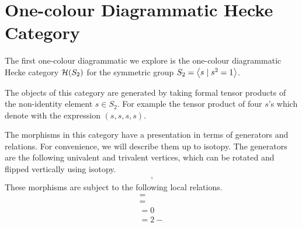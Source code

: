 \section{One-colour Diagrammatic Hecke Category}

The first one-colour diagrammatic we explore is the one-colour diagrammatic Hecke category $\mathcal{H}(S_2)$ for the symmetric group $S_2 = {\left\langle s \mathrel{|} s^2 = 1 \right\rangle}$. %

The objects of this category are generated by taking formal tensor products of the non-identity element $s \in S_2$. For example the tensor product of four $s$'s which denote with the expression $(s,s,s,s)$.

The morphisms in this category have a presentation in terms of generators and relations. For convenience, we will describe them up to isotopy. %
The generators are the following univalent and trivalent vertices, which can be rotated and flipped vertically using isotopy.
\begin{align} \label{eq:one-col-gen}
    
    \quad , \quad
    
\end{align}
These morphisms are subject to the following local relations.
\begin{subequations} \label{eq:one-col-sbim-rel}
    \begin{gather}
        \label{rel:one-col-frob-unit}
         = 
        \\
        \label{rel:one-col-frob-ass}
         = 
        \\
        \label{rel:one-col-needle}
         = 0
        \\
        \label{rel:one-col-poly-forcing}
         = 2  - 
    \end{gather}
\end{subequations}


